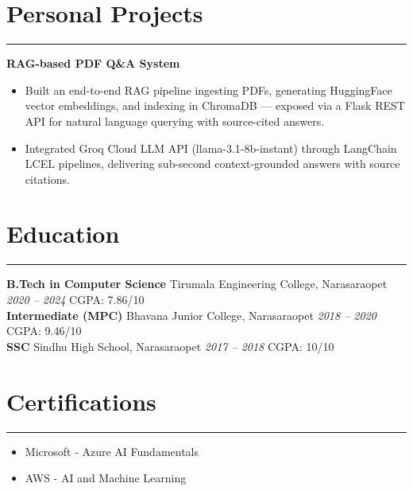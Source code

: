 \documentclass[10pt]{article}
\begin{document}
\section*{Personal Projects}
\vspace{1pt}\hrule\vspace{4pt}
\textbf{RAG-based PDF Q\&A System}
\begin{itemize}
  \item Built an end-to-end RAG pipeline ingesting PDFs, generating HuggingFace vector embeddings, and indexing in ChromaDB — exposed via a Flask REST API for natural language querying with source-cited answers.
  \item Integrated Groq Cloud LLM API (llama-3.1-8b-instant) through LangChain LCEL pipelines, delivering sub-second context-grounded answers with source citations.
\end{itemize}

\section*{Education}
\vspace{1pt}\hrule\vspace{4pt}
\textbf{B.Tech in Computer Science} \textbullet{} Tirumala Engineering College, Narasaraopet \hfill \textit{2020 -- 2024} \quad CGPA: 7.86/10 \\[1pt]
\textbf{Intermediate (MPC)} \textbullet{} Bhavana Junior College, Narasaraopet \hfill \textit{2018 -- 2020} \quad CGPA: 9.46/10 \\[1pt]
\textbf{SSC} \textbullet{} Sindhu High School, Narasaraopet \hfill \textit{2017 -- 2018} \quad CGPA: 10/10

\section*{Certifications}
\vspace{1pt}\hrule\vspace{4pt}
\begin{itemize}
  \item Microsoft - Azure AI Fundamentals
  \item AWS - AI and Machine Learning
\end{itemize}
\end{document}
